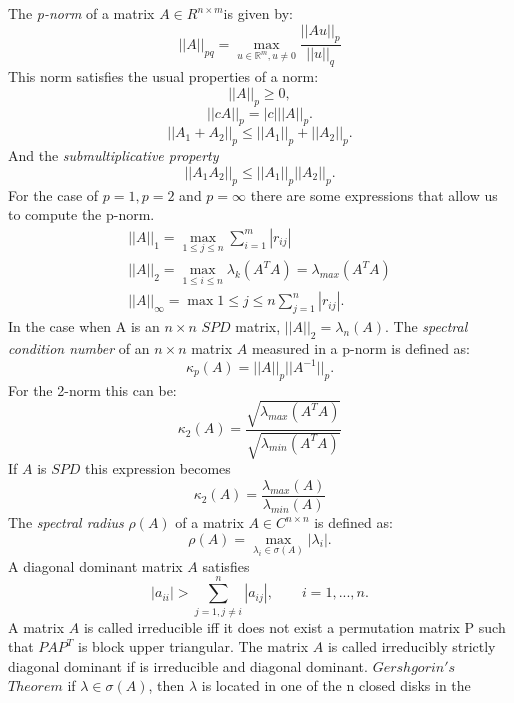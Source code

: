 \documentclass[12pt]{report}
\begin{document}
The \emph{p-norm} of a matrix $A\in R^{n\times m}$is given by:
$$||A||_{pq}=\max_{u\in\mathbb{R}^m,u\neq 0}\frac{||Au||_p}{||u||_q}$$
This norm satisfies the usual properties of a norm:
 \begin{equation*}
  ||A||_p \geq 0 ,
 \end{equation*}
 \begin{equation*}
  ||cA||_p=|c|||A||_p.
 \end{equation*}
  \begin{equation*}
  ||A_1+A_2||_p \leq ||A_1||_p +||A_2||_p.
 \end{equation*}
 And the \emph{submultiplicative property}
  \begin{equation*}
  ||A_1A_2||_p \leq ||A_1||_p ||A_2||_p.
 \end{equation*}
 For the case of $p=1,p=2$ and $p=\infty$ there are some expressions that allow us to
 compute the p-norm.
\begin{gather*}
||A||_1=\max_{1\leq j\leq n}\sum_{i=1}^m |r_{ij}| \\
||A||_2=\max_{1\leq i\leq n} \lambda_k (A^TA)=\lambda_{max}(A^TA) \\
||A||_{\infty}=\max{1\leq j\leq n}\sum_{j=1}^n |r_{ij}|.
\end{gather*}
In the case when A is an $n\times n$ $SPD$ matrix, $||A||_2=\lambda_n(A)$. 
 The \emph{spectral condition number} of an $n\times n$ matrix $A$ measured in a p-norm is defined as:
 $$\kappa_p(A)=||A||_p||A^{-1}||_p.$$
 For the 2-norm this can be:
 \begin{equation*}
 \kappa_2(A)=\frac{\sqrt{\lambda_{max}(A^TA)}}{\sqrt{\lambda_{min}(A^TA)}} 
 \end{equation*}
If $A$ is $SPD$ this expression becomes
 \begin{equation*}
 \kappa_2(A)=\frac{\lambda_{max}(A)}{\lambda_{min}(A)} 
 \end{equation*}
The \emph{spectral radius} $\rho(A)$ of a matrix $A \in C^{n\times n}$ is defined as:
$$\rho(A)=\max_{\lambda_i \in \sigma(A)}|\lambda_i|.$$
A diagonal dominant matrix $A$ satisfies 
\begin{equation*}
 |a_{ii}|>\sum_{j=1,j\neq i}^n|a_{ij}|, \qquad i=1,...,n.
\end{equation*}
A matrix $A$ is called irreducible iff it does not exist a permutation matrix P such that
$PAP^T$ is block upper triangular.
The matrix $A$ is called irreducibly strictly diagonal dominant if is irreducible and diagonal dominant.
$Gershgorin's$ $Theorem$ if $\lambda \in \sigma (A)$, then $\lambda$ is located in one of the n closed disks in the 
\end{document}
